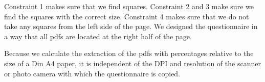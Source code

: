 \documentclass[../main/main.tex]{subfiles}
\begin{document}
	\noindent Constraint 1 makes sure that we find squares. Constraint 2 and 3 make sure we find the squares with the correct size. Constraint 4 makes sure that we do not take any squares from the left side of the page. We designed the questionnaire in a way that all pdfs are located at the right half of the page.
	
	Because we calculate the extraction of the pdfs with percentages relative to the size of a Din A4 paper, it is independent of the DPI and resolution of the scanner or photo camera with which the questionnaire is copied.
\end{document}
